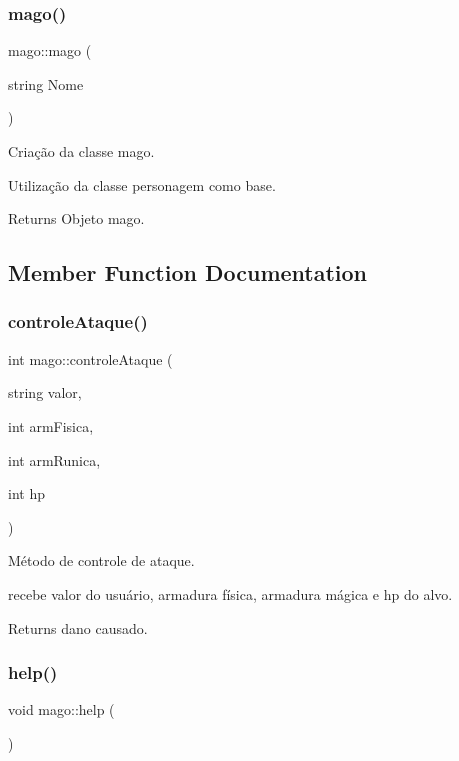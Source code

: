 \subsubsection{\texorpdfstring{mago()}{mago()}}
{\footnotesize\ttfamily mago\+::mago (\begin{DoxyParamCaption}\item[{string}]{Nome }\end{DoxyParamCaption})}



Criação da classe mago. 

Utilização da classe personagem como base. \begin{DoxyReturn}{Returns}
Objeto mago. 
\end{DoxyReturn}


\subsection{Member Function Documentation}
\mbox{\label{classmago_af10f6c9bcbbf77870f376a48b1cd0601}} 
\subsubsection{\texorpdfstring{controle\+Ataque()}{controleAtaque()}}
{\footnotesize\ttfamily int mago\+::controle\+Ataque (\begin{DoxyParamCaption}\item[{string}]{valor,  }\item[{int}]{arm\+Fisica,  }\item[{int}]{arm\+Runica,  }\item[{int}]{hp }\end{DoxyParamCaption})}



Método de controle de ataque. 

recebe valor do usuário, armadura física, armadura mágica e hp do alvo. \begin{DoxyReturn}{Returns}
dano causado. 
\end{DoxyReturn}
\mbox{\label{classmago_a8953a4898dea53c2c4a63542f49a7d86}} 
\subsubsection{\texorpdfstring{help()}{help()}}
{\footnotesize\ttfamily void mago\+::help (\begin{DoxyParamCaption}{ }\end{DoxyParamCaption})}



